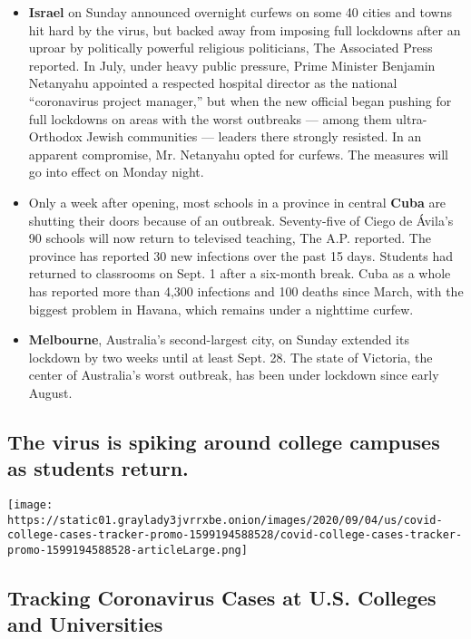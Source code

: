 \begin{itemize}
\item
  \textbf{Israel} on Sunday announced overnight curfews on some 40
  cities and towns hit hard by the virus, but backed away from imposing
  full lockdowns after an uproar by politically powerful religious
  politicians, The Associated Press reported. In July, under heavy
  public pressure, Prime Minister Benjamin Netanyahu appointed a
  respected hospital director as the national ``coronavirus project
  manager,'' but when the new official began pushing for full lockdowns
  on areas with the worst outbreaks --- among them ultra-Orthodox Jewish
  communities --- leaders there strongly resisted. In an apparent
  compromise, Mr. Netanyahu opted for curfews. The measures will go into
  effect on Monday night.
\item
  Only a week after opening, most schools in a province in central
  \textbf{Cuba} are shutting their doors because of an outbreak.
  Seventy-five of Ciego de Ávila's 90 schools will now return to
  televised teaching, The A.P. reported. The province has reported 30
  new infections over the past 15 days. Students had returned to
  classrooms on Sept. 1 after a six-month break. Cuba as a whole has
  reported more than 4,300 infections and 100 deaths since March, with
  the biggest problem in Havana, which remains under a nighttime curfew.
\item
  \textbf{Melbourne}, Australia's second-largest city, on Sunday
  extended its lockdown by two weeks until at least Sept. 28. The state
  of Victoria, the center of Australia's worst outbreak, has been under
  lockdown since early August.
\end{itemize}

\hypertarget{the-virus-is-spiking-around-college-campuses-as-students-return}{%
\subsection{The virus is spiking around college campuses as students
return.}\label{the-virus-is-spiking-around-college-campuses-as-students-return}}

\href{https://www.nytimes3xbfgragh.onion/interactive/2020/us/covid-college-cases-tracker.html}{}

\texttt{[image: https://static01.graylady3jvrrxbe.onion/images/2020/09/04/us/covid-college-cases-tracker-promo-1599194588528/covid-college-cases-tracker-promo-1599194588528-articleLarge.png]}

\hypertarget{tracking-coronavirus-cases-at-us-colleges-and-universities}{%
\subsection{Tracking Coronavirus Cases at U.S. Colleges and
Universities}\label{tracking-coronavirus-cases-at-us-colleges-and-universities}}

